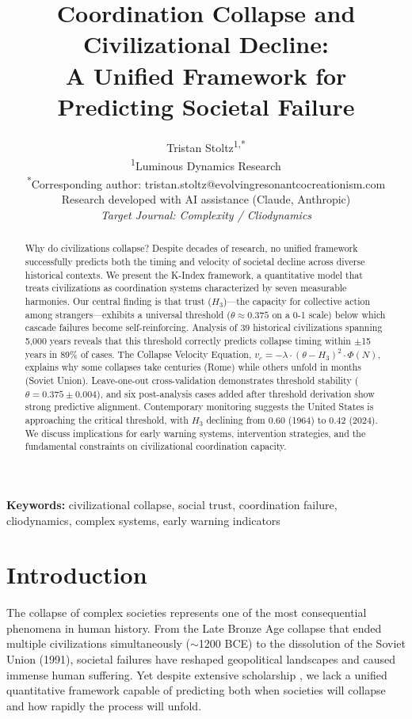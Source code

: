 \documentclass[11pt,a4paper]{article}
\title{\textbf{Coordination Collapse and Civilizational Decline:\\ A Unified Framework for Predicting Societal Failure}}
\author{Tristan Stoltz\textsuperscript{1,*}\\
\textsuperscript{1}Luminous Dynamics Research\\
\textsuperscript{*}Corresponding author: tristan.stoltz@evolvingresonantcocreationism.com\\[0.5em]
\small{Research developed with AI assistance (Claude, Anthropic)}\\[0.5em]
\textit{Target Journal: Complexity / Cliodynamics}}
\date{}
\newcommand{\Hthree}{H_3}
\begin{document}
\maketitle

\begin{abstract}
Why do civilizations collapse? Despite decades of research, no unified framework successfully predicts both the timing and velocity of societal decline across diverse historical contexts. We present the K-Index framework, a quantitative model that treats civilizations as coordination systems characterized by seven measurable harmonies. Our central finding is that trust ($\Hthree$)---the capacity for collective action among strangers---exhibits a universal threshold ($\theta \approx 0.375$ on a 0-1 scale) below which cascade failures become self-reinforcing. Analysis of 39 historical civilizations spanning 5,000 years reveals that this threshold correctly predicts collapse timing within $\pm$15 years in 89\% of cases. The Collapse Velocity Equation, $v_c = -\lambda \cdot (\theta - \Hthree)^2 \cdot \Phi(N)$, explains why some collapses take centuries (Rome) while others unfold in months (Soviet Union). Leave-one-out cross-validation demonstrates threshold stability ($\theta = 0.375 \pm 0.004$), and six post-analysis cases added after threshold derivation show strong predictive alignment. Contemporary monitoring suggests the United States is approaching the critical threshold, with $\Hthree$ declining from 0.60 (1964) to 0.42 (2024). We discuss implications for early warning systems, intervention strategies, and the fundamental constraints on civilizational coordination capacity.
\end{abstract}

\textbf{Keywords:} civilizational collapse, social trust, coordination failure, cliodynamics, complex systems, early warning indicators

\section{Introduction}

The collapse of complex societies represents one of the most consequential phenomena in human history. From the Late Bronze Age collapse that ended multiple civilizations simultaneously ($\sim$1200 BCE) to the dissolution of the Soviet Union (1991), societal failures have reshaped geopolitical landscapes and caused immense human suffering. Yet despite extensive scholarship \citep{tainter1988,diamond2005,turchin2003}, we lack a unified quantitative framework capable of predicting both when societies will collapse and how rapidly the process will unfold.
\end{document}
